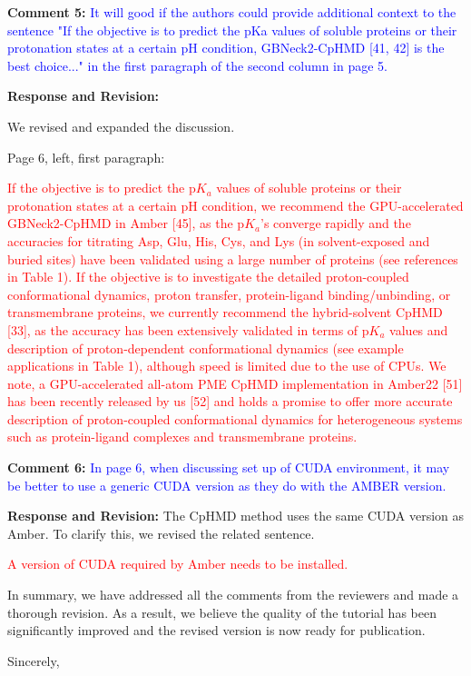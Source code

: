 \documentclass[11pt,letterpaper]{businessletter}
\newcommand{\pka}{p$K_a$}
\begin{document}
\begin{letter}
\textbf{Comment 5:}
\textcolor{Blue}{
It will good if the authors could provide additional context to the sentence "If the objective is to predict the pKa values of soluble proteins or their protonation states at a certain pH condition, GBNeck2-CpHMD [41, 42] is the best choice..." in the first paragraph of the second column in page 5.
}

\textbf{Response and Revision:} 

We revised and expanded the discussion.

Page 6, left, first paragraph: 

\textcolor{red}{
If the objective is to predict the {\pka} values of soluble proteins 
or their protonation states at a certain pH condition, we recommend
the GPU-accelerated GBNeck2-CpHMD in Amber [45], 
as the {\pka's} converge rapidly and the accuracies 
for titrating Asp, Glu, His, Cys, and Lys (in solvent-exposed and buried sites) have been validated using a large number of proteins (see references in Table 1).
If the objective is to investigate the detailed proton-coupled conformational dynamics, proton transfer, protein-ligand binding/unbinding, or transmembrane proteins, we currently recommend 
the hybrid-solvent CpHMD [33],
as the accuracy has been extensively validated in terms of
{\pka} values and description of proton-dependent conformational dynamics
(see example applications in Table 1),
although speed is limited due to the use of CPUs.
We note, a GPU-accelerated all-atom PME CpHMD 
implementation in Amber22 [51]
has been recently released by us [52] 
and holds a promise to offer more accurate description of
proton-coupled conformational dynamics for heterogeneous systems
such as protein-ligand complexes and transmembrane proteins.
}


\textbf{Comment 6:}
\textcolor{Blue}{
In page 6, when discussing set up of CUDA environment, it may be better to use a generic CUDA version as they do with the AMBER version.
}

\textbf{Response and Revision:} 
The CpHMD method uses the same CUDA version as Amber. To clarify this, we revised the related sentence.


\textcolor{red}{
A version of CUDA required by Amber needs to be installed.
}

In summary, we have addressed all the comments from the reviewers and made a thorough revision. As a result, we believe the quality of the tutorial has been significantly improved and the revised version is now ready for publication. 

\closing{Sincerely,}


\end{letter}
\end{document}
